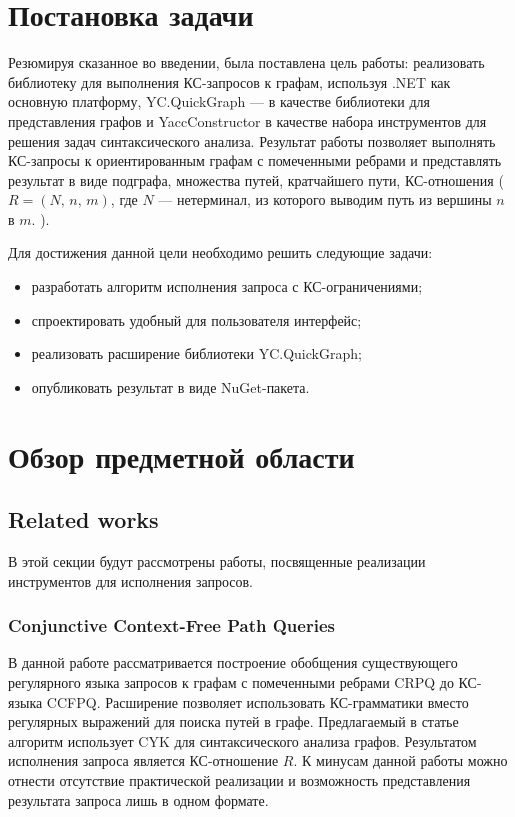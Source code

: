 \documentclass[14pt]{matmex-diploma-custom}
\begin{document}
\section{Постановка задачи}
    Резюмируя сказанное во введении, была поставлена цель работы: реализовать библиотеку для выполнения КС-запросов к графам, используя .NET как основную платформу, YC.QuickGraph --- в качестве библиотеки для представления графов и YaccConstructor в качестве набора инструментов для решения задач синтаксического анализа. Результат работы позволяет выполнять КС-запросы к ориентированным графам с помеченными ребрами и представлять результат в виде подграфа, множества путей, кратчайшего пути, КС-отношения (\(R = (N,\, n,\, m)\), где \(N\) --- нетерминал, из которого выводим путь из вершины \(n\) в \(m\). ). 
    
    Для достижения данной цели необходимо решить следующие задачи:
	\begin{itemize}
	    \item разработать алгоритм исполнения запроса с КС-ограничениями;
	    \item спроектировать удобный для пользователя интерфейс;
        \item реализовать расширение библиотеки YC.QuickGraph;
        \item опубликовать результат в виде NuGet-пакета.
	\end{itemize}

\section{Обзор предметной области}
	\subsection{Related works}
	В этой секции будут рассмотрены работы, посвященные реализации инструментов для исполнения запросов.
		\subsubsection*{Conjunctive Context-Free Path Queries}
		В данной работе рассматривается построение обобщения существующего регулярного языка запросов к графам с помеченными ребрами CRPQ до КС-языка CCFPQ. Расширение позволяет использовать КС-грамматики вместо регулярных выражений для поиска путей в графе. Предлагаемый в статье алгоритм использует CYK для синтаксического анализа графов. Результатом исполнения запроса является КС-отношение \(R\). К минусам данной работы можно отнести отсутствие практической реализации и возможность представления результата запроса лишь в одном формате.
\end{document}
